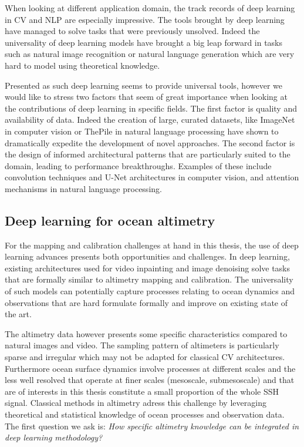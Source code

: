 \begin{bibunit}
When looking at different application domain, the track records of deep learning in CV\cite{chaiDeepLearningComputer2021} and NLP\cite{brownLanguageModelsAre2020} are especially impressive. 
The tools brought by deep learning have managed to solve tasks that were previously unsolved.
Indeed the universality of deep learning models have brought a big leap forward in tasks such as natural image recognition or natural language generation which are very hard to model using theoretical knowledge.

Presented as such deep learning seems to provide universal tools,  
however we would like to stress two factors that seem of great importance when looking at the contributions of deep learning in specific fields.
The first factor is quality and availability of data.
Indeed the creation of large, curated datasets, like ImageNet\cite{dengImageNetLargescaleHierarchical2009} in computer vision or ThePile\cite{gaoPile800GBDataset2020} in natural language processing have shown to dramatically expedite the development of novel approaches. 
The second factor is the design of informed architectural patterns that are particularly suited to the domain, leading to performance breakthroughs.
Examples of these include convolution techniques\cite{lecunHandwrittenDigitRecognition1989} and U-Net architectures\cite{ronnebergerUNetConvolutionalNetworks2015} in computer vision, and attention mechanisms\cite{vaswaniAttentionAllYou} in natural language processing.


\subsection{Deep learning for ocean altimetry}
For the mapping and calibration challenges at hand in this thesis, the use of deep learning advances presents both opportunities and challenges.
In deep learning, existing architectures used for video inpainting\cite{kimDeepVideoInpainting} and image denoising\cite{tianDeepLearningImage2020} solve tasks that are formally similar to altimetry mapping and calibration.
The universality of such models can potentially capture processes relating to ocean dynamics and observations that are hard formulate formally and improve on existing state of the art.

The altimetry data however presents some specific characteristics compared to natural images and video.
The sampling pattern of altimeters is particularly sparse and irregular which may not be adapted for classical CV architectures.
Furthermore ocean surface dynamics involve processes at different scales and the less well resolved that operate at finer scales (mesoscale, submesoscale) and that are of interests in this thesis constitute a small proportion of the whole SSH signal.
Classical methods in altimetry adress this challenge by leveraging theoretical and statistical knowledge of ocean processes and observation data.
The first question we ask is: \textit{How specific altimetry knowledge can be integrated in deep learning methodology?}


\end{bibunit}

